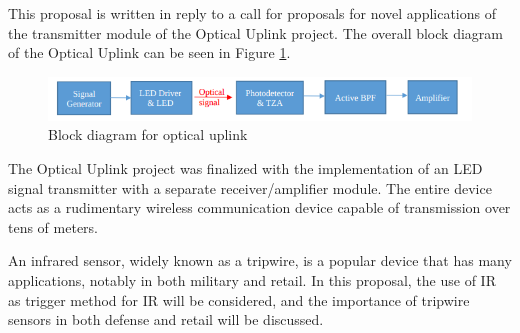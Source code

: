 




\noindent This proposal is written in reply to a call for proposals for novel applications of the transmitter module of the Optical Uplink project. The overall block diagram of the Optical Uplink can be seen in Figure \ref{fig:blockdiagram2}.


\begin{figure}[H]
    \centering
    \includegraphics[width=.9\textwidth ]{Introduction/blockdiagram}
    \caption{Block diagram for optical uplink \cite{b1}}
    \label{fig:blockdiagram2}
\end{figure}

The Optical Uplink project was finalized with the implementation of an LED signal transmitter with a separate receiver/amplifier module. The entire device acts as a rudimentary wireless communication device capable of transmission over tens of meters.

An infrared sensor, widely known as a tripwire, is a popular device that has many applications, notably in both military and retail. In this proposal, the use of IR as trigger method for IR will be considered, and the importance of tripwire sensors in both defense and retail will be discussed.





